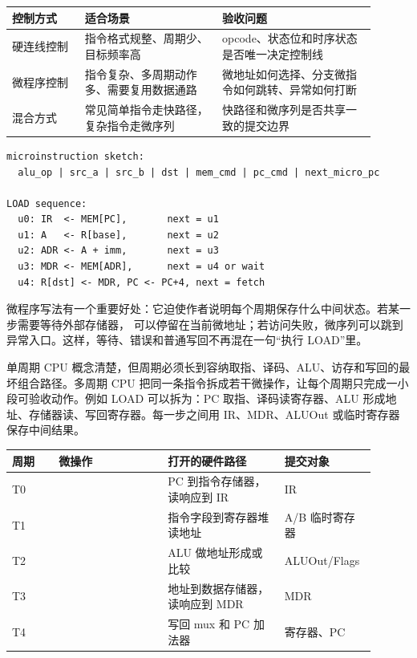 \begin{longtable}{L{0.18\linewidth}L{0.34\linewidth}L{0.38\linewidth}}
\toprule
控制方式 & 适合场景 & 验收问题 \\
\midrule
硬连线控制 & 指令格式规整、周期少、目标频率高 & opcode、状态位和时序状态是否唯一决定控制线 \\
微程序控制 & 指令复杂、多周期动作多、需要复用数据通路 & 微地址如何选择、分支微指令如何跳转、异常如何打断 \\
混合方式 & 常见简单指令走快路径，复杂指令走微序列 & 快路径和微序列是否共享一致的提交边界 \\
\bottomrule
\end{longtable}

\begin{lstlisting}
microinstruction sketch:
  alu_op | src_a | src_b | dst | mem_cmd | pc_cmd | next_micro_pc

LOAD sequence:
  u0: IR  <- MEM[PC],       next = u1
  u1: A   <- R[base],       next = u2
  u2: ADR <- A + imm,       next = u3
  u3: MDR <- MEM[ADR],      next = u4 or wait
  u4: R[dst] <- MDR, PC <- PC+4, next = fetch
\end{lstlisting}

微程序写法有一个重要好处：它迫使作者说明每个周期保存什么中间状态。若某一步需要等待外部存储器， 可以停留在当前微地址；若访问失败，微序列可以跳到异常入口。这样，等待、错误和普通写回不再混在一句“执行 LOAD”里。

单周期 CPU 概念清楚，但周期必须长到容纳取指、译码、ALU、访存和写回的最坏组合路径。多周期 CPU 把同一条指令拆成若干微操作，让每个周期只完成一小段可验收动作。例如 LOAD 可以拆为：PC 取指、译码读寄存器、ALU 形成地址、存储器读、写回寄存器。每一步之间用 IR、MDR、ALUOut 或临时寄存器保存中间结果。

\begin{longtable}{L{0.12\linewidth}L{0.28\linewidth}L{0.3\linewidth}L{0.2\linewidth}}
\toprule
周期 & 微操作 & 打开的硬件路径 & 提交对象 \\
\midrule
T0 &  & PC 到指令存储器，读响应到 IR & IR \\
T1 &  & 指令字段到寄存器堆读地址 & A/B 临时寄存器 \\
T2 &  & ALU 做地址形成或比较 & ALUOut/Flags \\
T3 &  & 地址到数据存储器，读响应到 MDR & MDR \\
T4 &  & 写回 mux 和 PC 加法器 & 寄存器、PC \\
\bottomrule
\end{longtable}


